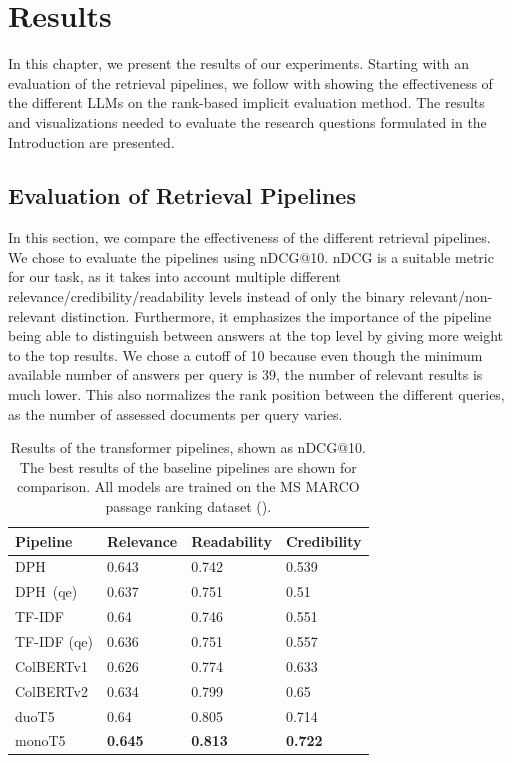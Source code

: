 \chapter{Results}\label{chapter:results}
In this chapter, we present the results of our experiments.
Starting with an evaluation of the retrieval pipelines, we follow with showing the effectiveness of the different LLMs on the rank-based implicit evaluation method.
The results and visualizations needed to evaluate the research questions formulated in the Introduction are presented.

\section{Evaluation of Retrieval Pipelines}
In this section, we compare the effectiveness of the different retrieval pipelines.
We chose to evaluate the pipelines using nDCG@10.
nDCG is a suitable metric for our task, as it takes into account multiple different relevance/credibility/readability levels instead of only the binary relevant/non-relevant distinction.
Furthermore, it emphasizes the importance of the pipeline being able to distinguish between answers at the top level by giving more weight to the top results.
We chose a cutoff of 10 because even though the minimum available number of answers per query is 39, the number of relevant results is much lower.
This also normalizes the rank position between the different queries, as the number of assessed documents per query varies.
\begin{table}[tb]
\centering
\begin{tabularx}{\textwidth}{lXXX}
\hline
Pipeline    & Relevance          & Readability        & Credibility        \\ \hline
DPH         & 0.643 & 0.742 & 0.539 \\
DPH\ (qe)     & 0.637 & 0.751 & 0.51  \\
TF-IDF     & 0.64  & 0.746 & 0.551 \\
TF-IDF (qe) & 0.636 & 0.751 & 0.557 \\
ColBERTv1      & 0.626 & 0.774 & 0.633 \\
ColBERTv2       & 0.634 & 0.799 & 0.65  \\
duoT5            & 0.64  & 0.805 & 0.714 \\
monoT5           & \textbf{0.645} & \textbf{0.813} & \textbf{0.722} \\
\hline
\end{tabularx}
\caption{Results of the transformer pipelines, shown as nDCG@10. The best results of the baseline pipelines are shown for comparison. All models are trained on the MS MARCO passage ranking dataset (\cite{bajaj:2016:MSMARCO}).}
\label{tab:transformer_pipelines}
\end{table}

